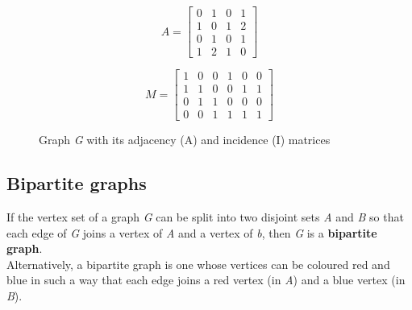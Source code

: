 \begin{figure}[H]
    \centering
    \begin{minipage}{0.5\textwidth}
        \centering
    \end{minipage}%
    \begin{minipage}{0.5\textwidth}
        \[
        A = \begin{bmatrix}
        0 & 1 & 0 & 1 \\
        1 & 0 & 1 & 2 \\
        0 & 1 & 0 & 1 \\
        1 & 2 & 1 & 0
        \end{bmatrix}
        \]
        
        \[
        M = \begin{bmatrix}
        1 & 0 & 0 & 1 & 0 & 0 \\
        1 & 1 & 0 & 0 & 1 & 1 \\
        0 & 1 & 1 & 0 & 0 & 0 \\
        0 & 0 & 1 & 1 & 1 & 1
        \end{bmatrix}
        \]
    \end{minipage}
    \caption{Graph \textit{G} with its adjacency (A) and incidence (I) matrices}
    \label{fig:matrix_representations}
\end{figure}


\subsection{Bipartite graphs}
If the vertex set of a graph \textit{G} can be split into two disjoint sets \textit{A} and \textit{B} so that each
edge of \textit{G} joins a vertex of \textit{A} and a vertex of \textit{b}, then \textit{G} is a \textbf{bipartite graph}. \\
Alternatively, a bipartite graph is one whose vertices can be coloured red and blue in such a way that each edge joins a red vertex (in \textit{A}) and a blue vertex (in \textit{B}). \\

